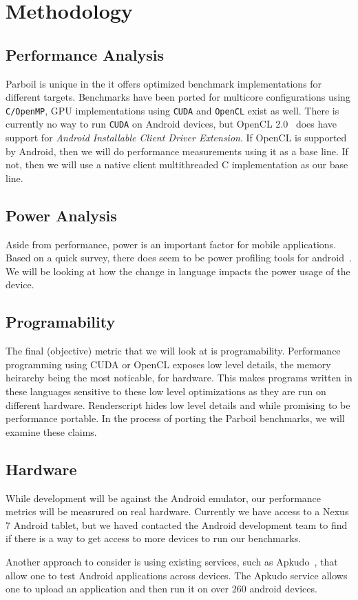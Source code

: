 
\section{Methodology}



\subsection{Performance Analysis}

Parboil is unique in the it offers optimized benchmark implementations for different targets.
Benchmarks have been ported for multicore configurations using {\tt C/OpenMP}, 
	GPU implementations using {\tt CUDA} and {\tt OpenCL} exist as well.
There is currently no way to run {\tt CUDA} on Android devices, but OpenCL 2.0~\cite{OpenCL} does
	have support for \textit{Android Installable Client Driver Extension}.
If OpenCL is supported by Android, then we will do performance measurements using it as a base line.
If not, then we will use a native client multithreaded C implementation as our base line.

\subsection{Power Analysis}

Aside from performance, power is an important factor for mobile applications.
Based on a quick survey, there does seem to be power profiling tools for android~\cite{Google:2014:Power}.
We will be looking at how the change in language impacts the power usage of the device.

\subsection{Programability}

The final (objective) metric that we will look at is programability.
Performance programming using CUDA or OpenCL exposes low level details,
	the memory heirarchy being the most noticable, for hardware.
This makes programs written in these languages sensitive to these low
	level optimizations as they are run on different hardware.
Renderscript hides low level details and while promising to be performance
	portable.
In the process of porting the Parboil benchmarks, we will
	examine these claims.

\subsection{Hardware}

While development will be against the Android emulator, our performance
	metrics will be measrured on real hardware.
Currently we have access to a Nexus 7 Android tablet, but we haved contacted
	the Android development team to find if there is a way to get
	access to more devices to run our benchmarks.

Another approach to consider is using existing services,
	such as Apkudo~\cite{apkudo}, that allow one to test Android
	applications across devices.
The Apkudo service allows one to upload an application and then run it on 
	over 260 android devices.

